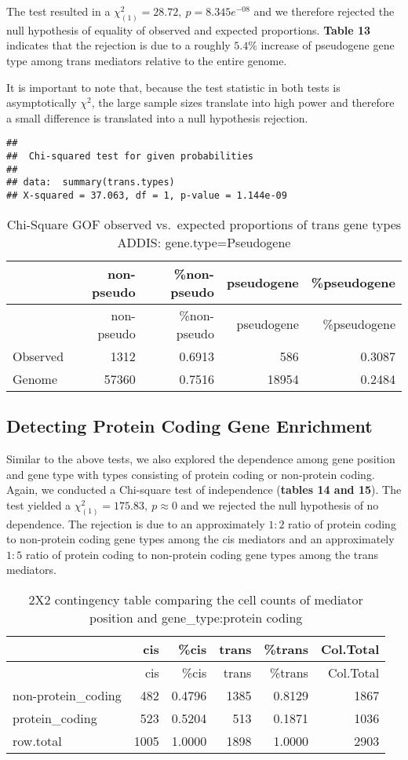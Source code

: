 \documentclass[
  12pt,
]{article}
\begin{document}
The test resulted in a \(\chi_{(1)}^2 = 28.72, \ p = 8.345e^{-08}\) and
we therefore rejected the null hypothesis of equality of observed and
expected proportions. \textbf{Table 13} indicates that the rejection is
due to a roughly \(5.4\%\) increase of pseudogene gene type among trans
mediators relative to the entire genome.

It is important to note that, because the test statistic in both tests
is asymptotically \(\chi^2\), the large sample sizes translate into high
power and therefore a small difference is translated into a null
hypothesis rejection.

\begin{verbatim}
## 
##  Chi-squared test for given probabilities
## 
## data:  summary(trans.types)
## X-squared = 37.063, df = 1, p-value = 1.144e-09
\end{verbatim}

\begin{longtable}[]{@{}lrrrr@{}}
\caption{Chi-Square GOF observed vs.~expected proportions of trans gene
types ADDIS: gene.type=Pseudogene}\tabularnewline
\toprule
& non-pseudo & \%non-pseudo & pseudogene & \%pseudogene\tabularnewline
\midrule
\endfirsthead
\toprule
& non-pseudo & \%non-pseudo & pseudogene & \%pseudogene\tabularnewline
\midrule
\endhead
Observed & 1312 & 0.6913 & 586 & 0.3087\tabularnewline
Genome & 57360 & 0.7516 & 18954 & 0.2484\tabularnewline
\bottomrule
\end{longtable}

\subsection*{Detecting Protein Coding Gene Enrichment}

Similar to the above tests, we also explored the dependence among gene
position and gene type with types consisting of protein coding or
non-protein coding. Again, we conducted a Chi-square test of
independence (\textbf{tables 14 and 15}). The test yielded a
\(\chi_{(1)}^2 = 175.83, \ p \approx 0\) and we rejected the null
hypothesis of no dependence. The rejection is due to an approximately
\(1:2\) ratio of protein coding to non-protein coding gene types among
the cis mediators and an approximately \(1:5\) ratio of protein coding
to non-protein coding gene types among the trans mediators.

\begin{longtable}[]{@{}lrrrrr@{}}
\caption{2X2 contingency table comparing the cell counts of mediator
position and gene\_type:protein coding}\tabularnewline
\toprule
& cis & \%cis & trans & \%trans & Col.Total\tabularnewline
\midrule
\endfirsthead
\toprule
& cis & \%cis & trans & \%trans & Col.Total\tabularnewline
\midrule
\endhead
non-protein\_coding & 482 & 0.4796 & 1385 & 0.8129 & 1867\tabularnewline
protein\_coding & 523 & 0.5204 & 513 & 0.1871 & 1036\tabularnewline
row.total & 1005 & 1.0000 & 1898 & 1.0000 & 2903\tabularnewline
\bottomrule
\end{longtable}
\end{document}
